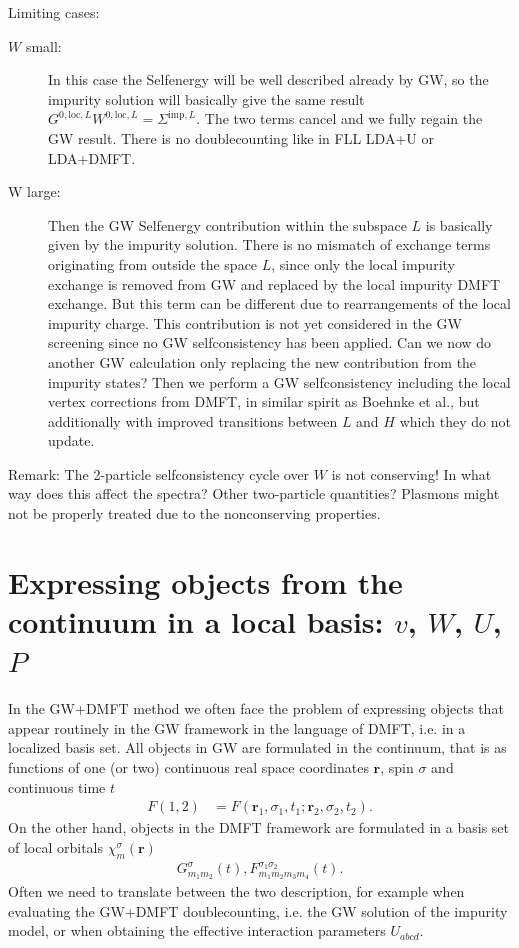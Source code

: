 \documentclass[12pt,a4paper]{scrartcl}
\numberwithin{equation}{section}
\newcommand{\cng}[1]{{\color{red}#1}}
\begin{document}
Limiting cases:
\begin{description}
\item[$W$ small:] In this case the Selfenergy will be well described already by GW, so the impurity solution
will basically give the same result $G^{0,\mathrm{loc},L}W^{0,\mathrm{loc},L} = \Sigma^{\mathrm{imp},L}$.
The two terms cancel and we fully regain the GW result. There is no doublecounting like in FLL LDA+U or LDA+DMFT.
\item[W large:] Then the GW Selfenergy contribution within the subspace $L$ is basically given by the impurity solution.
There is no mismatch of exchange terms originating from outside the space $L$, since only the local impurity exchange
is removed from GW and replaced by the local impurity DMFT exchange. But this term can be different due to rearrangements
of the local impurity charge. This contribution is not yet considered in the GW screening since no GW selfconsistency
has been applied.
\cng{Can we now do another GW calculation only replacing the new contribution from the impurity states?
Then we perform a GW selfconsistency including the  local vertex corrections from DMFT, in similar spirit as Boehnke et al., but additionally with improved transitions between
$L$ and $H$ which they do not update.}
\end{description}
Remark: The 2-particle selfconsistency cycle over $W$ is not conserving! In what way
does this affect the spectra? Other two-particle quantities?
Plasmons might not be properly treated due to the nonconserving
properties.


\section{Expressing objects from the continuum in a local basis: $v$, $W$, $U$, $P$}

In the GW+DMFT method we often face the problem of expressing objects that appear
routinely in the GW framework in the language of DMFT, i.e. in a localized basis set.
All objects in GW are formulated in the continuum, that is as functions
of one (or two) continuous real space coordinates $\mathbf{r}$, spin $\sigma$ and continuous time $t$
\begin{align}
 F(1,2) &= F(\mathbf{r}_1,\sigma_1,t_1;\mathbf{r}_2,\sigma_2,t_2).
\end{align}
On the other hand, objects in the DMFT framework are formulated in 
a basis set of local orbitals $\chi^{\sigma}_m(\mathbf{r})$
\begin{align}
 G^{\sigma}_{m_1m_2}(t), F^{\sigma_1\sigma_2}_{m_1m_2m_3m_4}(t).
\end{align}
Often we need to translate between the two description, for example
when evaluating the GW+DMFT doublecounting, i.e. the GW solution of
the impurity model, or when obtaining the effective interaction
parameters $U_{abcd}$.
\end{document}
